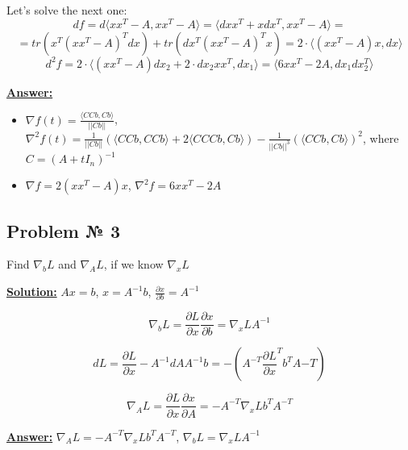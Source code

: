 Let's solve the next one:
\begin{equation*}
    df = d \langle xx^T - A, xx^T - A \rangle = \langle dxx^T + xdx^T, xx^T - A\rangle = 
\end{equation*}
\begin{equation*}
    = tr(x^T(xx^T - A)^Tdx) + tr(dx^T(xx^T-A)^Tx) = 
    2 \cdot \langle (xx^T -A)x, dx\rangle
\end{equation*}
\begin{equation*}
    d^2f = 2 \cdot \langle (xx^T -A)dx_2 + 2\cdot dx_2 xx^T, dx_1\rangle = \langle 6xx^T-2A, dx_1dx_2^T \rangle
\end{equation*}


\underline{\textbf{Answer:}} 
\begin{itemize}
    \item $\nabla f(t) =\frac{\langle CCb, Cb \rangle}{||Cb||}$, $\nabla^2f(t) = \frac{1}{||Cb||}\left(\langle CCb, CCb\rangle + 2\langle CCCb, Cb\rangle \right) - \frac{1}{||Cb||^3 }(\langle CCb, Cb \rangle)^2$, where $C = (A+tI_n)^{-1}$
    \item $\nabla f = 2(xx^T -A)x$, $\nabla^2f = 6xx^T-2A$
\end{itemize}


\subsection{Problem № 3} 
Find $\nabla_b L$ and $\nabla_A L$, if we know $\nabla_x L$


\underline{\textbf{Solution:}} 
$Ax = b$, $x = A^{-1}b$, $\frac{\partial x}{\partial b} = A^{-1}$

\begin{equation*}
    \nabla_b L = \frac{\partial L}{\partial x} \frac{\partial x}{\partial b} = \nabla_x L A^{-1}
\end{equation*}

\begin{equation*}
    dL = \frac{\partial L}{\partial x} -A^{-1}dA A^{-1}b = - (A^{-T}\frac{\partial L}{\partial x}^T b^TA{-T})
\end{equation*}

\begin{equation*}
    \nabla_A L = \frac{\partial L}{\partial x} \frac{\partial x}{\partial A} = - A^{-T} \nabla_x L b^TA^{-T}
\end{equation*}

\underline{\textbf{Answer:}} $ \nabla_A L = - A^{-T} \nabla_x L b^TA^{-T}$, $\nabla_b L = \nabla_x L A^{-1}$

